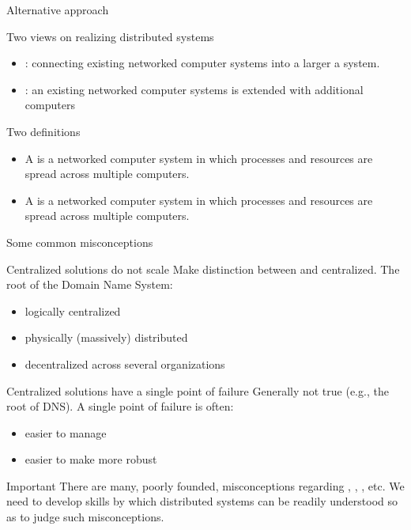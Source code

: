 \begin{slide}{Alternative approach}
  \begin{block}{Two views on realizing distributed systems}
    \begin{itemize}
    \item {}: connecting existing networked computer systems into a larger a system.
    \item {}: an existing networked computer systems is extended with additional
      computers 
    \end{itemize}
  \end{block}
  \begin{block}{Two definitions}
    \begin{itemize}
    \item A  is a networked computer system in which processes and resources are
       spread across multiple computers.
    \item A  is a networked computer system in which processes and resources are
       spread across multiple computers.
    \end{itemize}
  \end{block}
\end{slide}
  \begin{slide}{Some common misconceptions}
    \begin{block}{Centralized solutions do not scale}
      Make distinction between  and  centralized. The root of the Domain Name
      System:\vspace*{-6pt}
      \begin{itemize}\tightlist
      \item logically centralized
      \item physically (massively) distributed
      \item decentralized across several organizations
      \end{itemize}
    \end{block}
    \begin{block}{Centralized solutions have a single point of failure}
      Generally not true (e.g., the root of DNS). A single point of
      failure is often:\vspace*{-6pt}
      \begin{itemize}\tightlist
      \item easier to manage
      \item easier to make more robust
      \end{itemize}
    \end{block}
    \begin{alertblock}{Important}
      There are many, poorly founded, misconceptions regarding , ,
      , etc. We need to develop skills by which distributed systems can be readily understood so
      as to judge such misconceptions.
    \end{alertblock}
  \end{slide}
